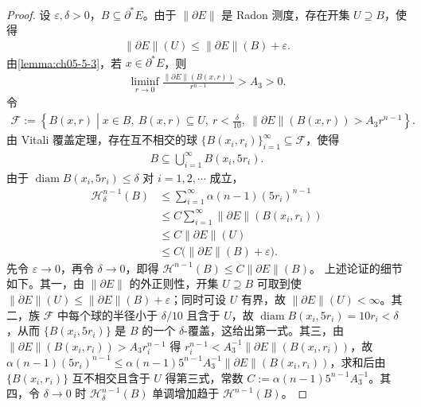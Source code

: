 \documentclass[../../main.tex]{subfiles}%
\begin{document}
\begin{proof}
设 $\varepsilon,\delta>0$，$B\subseteq\partial^*E$。由于 $\lVert\partial E\rVert$ 是 Radon 测度，存在开集 $U\supseteq B$，使得
\begin{align*}
\lVert\partial E\rVert(U)\leqslant\lVert\partial E\rVert(B)+\varepsilon .
\end{align*}
由\cref{lemma:ch05-5-3}，若 $x\in\partial^*E$，则%
\begin{align*}
\liminf_{r\to0}\frac{\lVert\partial E\rVert(B(x,r))}{r^{n-1}}>A_3>0 .
\end{align*}
令
\begin{align*}
\mathcal{F}:=\left\{B(x,r)\middle|x\in B,\ B(x,r)\subseteq U,\ r<\frac{\delta}{10},\ \lVert\partial E\rVert(B(x,r))>A_3r^{n-1}\right\}.
\end{align*}
由 Vitali 覆盖定理，存在互不相交的球 $\{B(x_i,r_i)\}_{i=1}^{\infty}\subseteq\mathcal{F}$，使得
\begin{align*}
B\subseteq\bigcup_{i=1}^{\infty}B(x_i,5r_i).
\end{align*}
由于 $\operatorname{diam}B(x_i,5r_i)\leqslant\delta$ 对 $i=1,2,\cdots$ 成立，
\begin{align*}
\mathcal{H}^{n-1}_{\delta}(B)
&\leqslant\sum_{i=1}^{\infty}\alpha(n-1)(5r_i)^{n-1}\\
&\leqslant C\sum_{i=1}^{\infty}\lVert\partial E\rVert(B(x_i,r_i))\\
&\leqslant C\lVert\partial E\rVert(U)\\
&\leqslant C\bigl(\lVert\partial E\rVert(B)+\varepsilon\bigr).
\end{align*}
先令 $\varepsilon\to0$，再令 $\delta\to0$，即得 $\mathcal{H}^{n-1}(B)\leqslant C\lVert\partial E\rVert(B)$。
上述论证的细节如下。其一，由 $\lVert\partial E\rVert$ 的外正则性，开集 $U\supseteq B$ 可取到使 $\lVert\partial E\rVert(U)\leqslant\lVert\partial E\rVert(B)+\varepsilon$；同时可设 $U$ 有界，故 $\lVert\partial E\rVert(U)<\infty$。其二，族 $\mathcal{F}$ 中每个球的半径小于 $\delta/10$ 且含于 $U$，故 $\operatorname{diam}B(x_i,5r_i)=10r_i<\delta$，从而 $\{B(x_i,5r_i)\}$ 是 $B$ 的一个 $\delta$-覆盖，这给出第一式。其三，由 $\lVert\partial E\rVert(B(x_i,r_i))>A_3r_i^{n-1}$ 得 $r_i^{n-1}<A_3^{-1}\lVert\partial E\rVert(B(x_i,r_i))$，故 $\alpha(n-1)(5r_i)^{n-1}\leqslant\alpha(n-1)5^{n-1}A_3^{-1}\lVert\partial E\rVert(B(x_i,r_i))$，求和后由 $\{B(x_i,r_i)\}$ 互不相交且含于 $U$ 得第三式，常数 $C:=\alpha(n-1)5^{n-1}A_3^{-1}$。其四，令 $\delta\to0$ 时 $\mathcal{H}^{n-1}_{\delta}(B)$ 单调增加趋于 $\mathcal{H}^{n-1}(B)$。
\end{proof}
\end{document}
